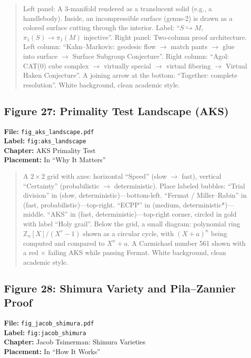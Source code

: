 \begin{quote}
Left panel: A 3-manifold rendered as a translucent solid (e.g., a handlebody). Inside, an incompressible surface (genus-2) is drawn as a colored surface cutting through the interior. Label: ``$S \hookrightarrow M$, $\pi_1(S) \to \pi_1(M)$ injective''. Right panel: Two-column proof architecture. Left column: ``Kahn--Markovic: geodesic flow $\to$ match pants $\to$ glue into surface $\to$ Surface Subgroup Conjecture''. Right column: ``Agol: CAT(0) cube complex $\to$ virtually special $\to$ virtual fibering $\to$ Virtual Haken Conjecture''. A joining arrow at the bottom: ``Together: complete resolution''. White background, clean academic style.
\end{quote}

\subsection*{Figure 27: Primality Test Landscape (AKS)}
\textbf{File:} \texttt{fig\_aks\_landscape.pdf} \\
\textbf{Label:} \texttt{fig:aks\_landscape} \\
\textbf{Chapter:} AKS Primality Test \\
\textbf{Placement:} In ``Why It Matters''

\begin{quote}
A $2 \times 2$ grid with axes: horizontal ``Speed'' (slow $\to$ fast), vertical ``Certainty'' (probabilistic $\to$ deterministic). Place labeled bubbles: ``Trial division'' in (slow, deterministic)---bottom-left. ``Fermat / Miller--Rabin'' in (fast, probabilistic)---top-right. ``ECPP'' in (medium, deterministic*)---middle. ``AKS'' in (fast, deterministic)---top-right corner, circled in gold with label ``Holy grail''. Below the grid, a small diagram: polynomial ring $\mathbb{Z}_n[X]/(X^r - 1)$ shown as a circular cycle, with $(X+a)^n$ being computed and compared to $X^n + a$. A Carmichael number 561 shown with a red $\times$ failing AKS while passing Fermat. White background, clean academic style.
\end{quote}

\subsection*{Figure 28: Shimura Variety and Pila--Zannier Proof}
\textbf{File:} \texttt{fig\_jacob\_shimura.pdf} \\
\textbf{Label:} \texttt{fig:jacob\_shimura} \\
\textbf{Chapter:} Jacob Tsimerman: Shimura Varieties \\
\textbf{Placement:} In ``How It Works''


